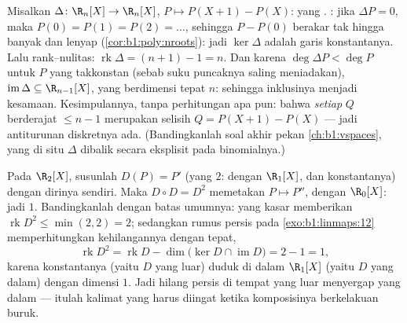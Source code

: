 \begin{example}
\label{ex:b1:linmaps:delta}
Misalkan $\Delta \colon \R_n[X] \to \R_n[X]$, $P \mapsto P(X+1) -
P(X)$: yang . : jika $\Delta P = 0$, maka $P(0) = P(1) =
P(2) = \dots$, sehingga $P - P(0)$ berakar tak hingga banyak dan
lenyap (\cref{cor:b1:poly:nroots}): jadi $\ker\Delta$ adalah garis
konstantanya. Lalu rank--nulitas: $\operatorname{rk}\Delta = (n + 1) - 1
= n$. Dan karena $\deg \Delta P < \deg P$ untuk $P$ yang takkonstan (sebab suku
puncaknya saling meniadakan), $\operatorname{im}\Delta \subseteq \R_{n-1}[X]$,
yang berdimensi tepat $n$: sehingga inklusinya menjadi kesamaan.
Kesimpulannya, tanpa perhitungan  apa pun: bahwa \emph{setiap}
 $Q$ berderajat $\leq n - 1$ merupakan selisih $Q = P(X+1)
- P(X)$ --- jadi antiturunan diskretnya ada. (Bandingkanlah
soal akhir pekan \cref{ch:b1:vspaces}, yang di situ $\Delta$
dibalik secara eksplisit pada  binomialnya.)
\end{example}

\begin{example}
\label{ex:b1:linmaps:rankbookkeeping}
Pada $\R_2[X]$, susunlah  $D(P) = P'$ (yang  $2$: dengan
 $\R_1[X]$, dan  konstantanya) dengan dirinya sendiri. Maka $D
\circ D = D^2$ memetakan $P \mapsto P''$, dengan  $\R_0[X]$: jadi 
$1$. Bandingkanlah dengan batas umumnya: yang kasar memberikan
$\operatorname{rk} D^2 \leq \min(2, 2) = 2$; sedangkan rumus persis
pada \cref{exo:b1:linmaps:12} memperhitungkan kehilangannya dengan tepat,
\[
\operatorname{rk} D^2 = \operatorname{rk} D -
\dim\bigl(\ker D \cap \operatorname{im} D\bigr) = 2 - 1 = 1 ,
\]
karena konstantanya (yaitu  $D$ yang luar) duduk di dalam
$\R_1[X]$ (yaitu  $D$ yang dalam) dengan dimensi $1$. Jadi 
hilang persis di tempat  yang luar menyergap  yang dalam
--- itulah kalimat yang harus diingat ketika  komposisinya berkelakuan buruk.
\end{example}

